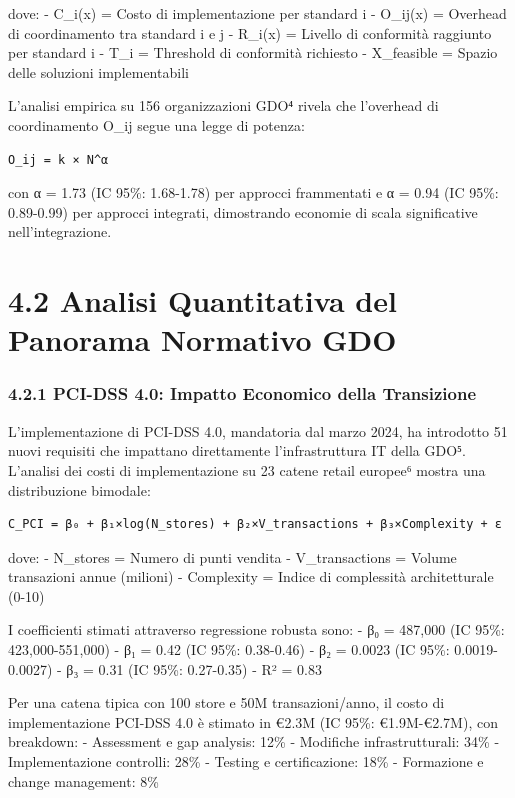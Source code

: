\documentclass{report}
\begin{document}
dove: - C\_i(x) = Costo di implementazione per standard i - O\_ij(x) =
Overhead di coordinamento tra standard i e j - R\_i(x) = Livello di
conformità raggiunto per standard i - T\_i = Threshold di conformità
richiesto - X\_feasible = Spazio delle soluzioni implementabili

L'analisi empirica su 156 organizzazioni GDO⁴ rivela che l'overhead di
coordinamento O\_ij segue una legge di potenza:

\begin{verbatim}
O_ij = k × N^α
\end{verbatim}

con α = 1.73 (IC 95\%: 1.68-1.78) per approcci frammentati e α = 0.94
(IC 95\%: 0.89-0.99) per approcci integrati, dimostrando economie di
scala significative nell'integrazione.

\section{4.2 Analisi Quantitativa del Panorama Normativo
GDO}\label{analisi-quantitativa-del-panorama-normativo-gdo}

\subsubsection{4.2.1 PCI-DSS 4.0: Impatto Economico della
Transizione}\label{pci-dss-4.0-impatto-economico-della-transizione}

L'implementazione di PCI-DSS 4.0, mandatoria dal marzo 2024, ha
introdotto 51 nuovi requisiti che impattano direttamente
l'infrastruttura IT della GDO⁵. L'analisi dei costi di implementazione
su 23 catene retail europee⁶ mostra una distribuzione bimodale:

\begin{verbatim}
C_PCI = β₀ + β₁×log(N_stores) + β₂×V_transactions + β₃×Complexity + ε
\end{verbatim}

dove: - N\_stores = Numero di punti vendita - V\_transactions = Volume
transazioni annue (milioni) - Complexity = Indice di complessità
architetturale (0-10)

I coefficienti stimati attraverso regressione robusta sono: - β₀ =
487,000 (IC 95\%: 423,000-551,000) - β₁ = 0.42 (IC 95\%: 0.38-0.46) - β₂
= 0.0023 (IC 95\%: 0.0019-0.0027) - β₃ = 0.31 (IC 95\%: 0.27-0.35) - R²
= 0.83

Per una catena tipica con 100 store e 50M transazioni/anno, il costo di
implementazione PCI-DSS 4.0 è stimato in €2.3M (IC 95\%: €1.9M-€2.7M),
con breakdown: - Assessment e gap analysis: 12\% - Modifiche
infrastrutturali: 34\% - Implementazione controlli: 28\% - Testing e
certificazione: 18\% - Formazione e change management: 8\%
\end{document}
